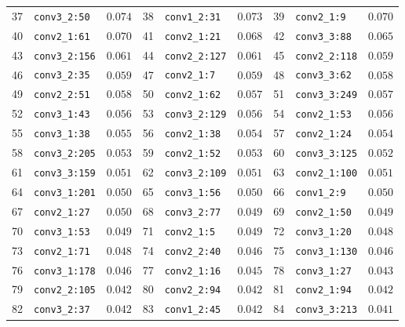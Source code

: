 \begin{center}
\begin{longtable}{c l l | c l l | c l l }
        37 & \texttt{conv3\_2:50} & $0.074$ & 38 & \texttt{conv1\_2:31} & $0.073$ & 39 & \texttt{conv2\_1:9} & $0.070$ \\
        40 & \texttt{conv2\_1:61} & $0.070$ & 41 & \texttt{conv2\_1:21} & $0.068$ & 42 & \texttt{conv3\_3:88} & $0.065$ \\
        43 & \texttt{conv3\_2:156} & $0.061$ & 44 & \texttt{conv2\_2:127} & $0.061$ & 45 & \texttt{conv2\_2:118} & $0.059$ \\
        46 & \texttt{conv3\_2:35} & $0.059$ & 47 & \texttt{conv2\_1:7} & $0.059$ & 48 & \texttt{conv3\_3:62} & $0.058$ \\
        49 & \texttt{conv2\_2:51} & $0.058$ & 50 & \texttt{conv2\_1:62} & $0.057$ & 51 & \texttt{conv3\_3:249} & $0.057$ \\
        52 & \texttt{conv3\_1:43} & $0.056$ & 53 & \texttt{conv3\_2:129} & $0.056$ & 54 & \texttt{conv2\_1:53} & $0.056$ \\
        55 & \texttt{conv3\_1:38} & $0.055$ & 56 & \texttt{conv2\_1:38} & $0.054$ & 57 & \texttt{conv2\_1:24} & $0.054$ \\
        58 & \texttt{conv3\_2:205} & $0.053$ & 59 & \texttt{conv2\_1:52} & $0.053$ & 60 & \texttt{conv3\_3:125} & $0.052$ \\
        61 & \texttt{conv3\_3:159} & $0.051$ & 62 & \texttt{conv3\_2:109} & $0.051$ & 63 & \texttt{conv2\_1:100} & $0.051$ \\
        64 & \texttt{conv3\_1:201} & $0.050$ & 65 & \texttt{conv3\_1:56} & $0.050$ & 66 & \texttt{conv1\_2:9} & $0.050$ \\
        67 & \texttt{conv2\_1:27} & $0.050$ & 68 & \texttt{conv3\_2:77} & $0.049$ & 69 & \texttt{conv2\_1:50} & $0.049$ \\
        70 & \texttt{conv3\_1:53} & $0.049$ & 71 & \texttt{conv2\_1:5} & $0.049$ & 72 & \texttt{conv3\_1:20} & $0.048$ \\
        73 & \texttt{conv2\_1:71} & $0.048$ & 74 & \texttt{conv2\_2:40} & $0.046$ & 75 & \texttt{conv3\_1:130} & $0.046$ \\
        76 & \texttt{conv3\_1:178} & $0.046$ & 77 & \texttt{conv2\_1:16} & $0.045$ & 78 & \texttt{conv3\_1:27} & $0.043$ \\
        79 & \texttt{conv2\_2:105} & $0.042$ & 80 & \texttt{conv2\_2:94} & $0.042$ & 81 & \texttt{conv2\_1:94} & $0.042$ \\
        82 & \texttt{conv3\_2:37} & $0.042$ & 83 & \texttt{conv1\_2:45} & $0.042$ & 84 & \texttt{conv3\_3:213} & $0.041$ \\

\end{longtable}
\end{center}
